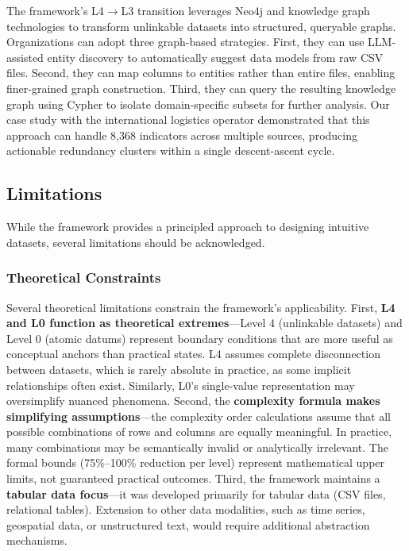 \documentclass[Afour,times,sageh]{sagej}
\begin{document}
The framework's L4$\to$L3 transition leverages Neo4j and knowledge graph technologies to transform unlinkable datasets into structured, queryable graphs. Organizations can adopt three graph-based strategies. First, they can use LLM-assisted entity discovery to automatically suggest data models from raw CSV files. Second, they can map columns to entities rather than entire files, enabling finer-grained graph construction. Third, they can query the resulting knowledge graph using Cypher to isolate domain-specific subsets for further analysis. Our case study with the international logistics operator demonstrated that this approach can handle 8,368 indicators across multiple sources, producing actionable redundancy clusters within a single descent-ascent cycle.

\subsection{Limitations}



While the framework provides a principled approach to designing intuitive datasets, several limitations should be acknowledged.

\subsubsection{Theoretical Constraints}

Several theoretical limitations constrain the framework's applicability. First, \textbf{L4 and L0 function as theoretical extremes}---Level 4 (unlinkable datasets) and Level 0 (atomic datums) represent boundary conditions that are more useful as conceptual anchors than practical states. L4 assumes complete disconnection between datasets, which is rarely absolute in practice, as some implicit relationships often exist. Similarly, L0's single-value representation may oversimplify nuanced phenomena. Second, the \textbf{complexity formula makes simplifying assumptions}---the complexity order calculations assume that all possible combinations of rows and columns are equally meaningful. In practice, many combinations may be semantically invalid or analytically irrelevant. The formal bounds (75\%--100\% reduction per level) represent mathematical upper limits, not guaranteed practical outcomes. Third, the framework maintains a \textbf{tabular data focus}---it was developed primarily for tabular data (CSV files, relational tables). Extension to other data modalities, such as time series, geospatial data, or unstructured text, would require additional abstraction mechanisms.
\end{document}
